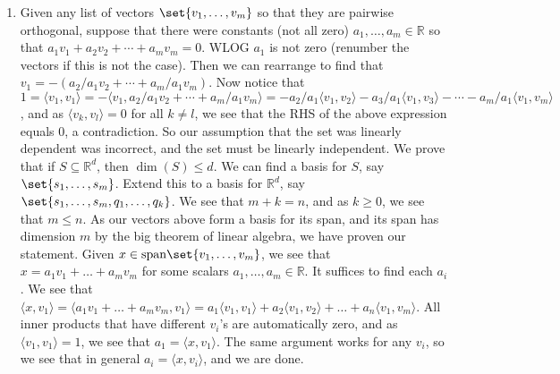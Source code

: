 \documentclass[12pt]{article}
\theoremstyle{definition}
\theoremstyle{remark}
\newcommand{\R}{\mathbb{R}}
\renewcommand{\ip}[2]{\langle #1, #2 \rangle}
\begin{document}
\begin{enumerate}[leftmargin=\labelsep]
		\item Given any list of vectors $\set{v_1, \ldots, v_m}$ so that they are pairwise orthogonal, suppose that there were constants (not all zero) $a_1, \ldots, a_m \in \R$ so that $a_1v_1 + a_2v_2 + \cdots + a_mv_m = 0$. WLOG $a_1$ is not zero (renumber the vectors if this is not the case). Then we can rearrange to find that $v_1 = -(a_2/a_1v_2 + \cdots + a_m/a_1v_m)$. Now notice that $1 = \ip{v_1}{v_1} = -\ip{v_1}{a_2/a_1v_2 + \cdots + a_m/a_1v_m} = -a_2/a_1\ip{v_1}{v_2}-a_3/a_1\ip{v_1}{v_3}-\cdots-a_m/a_1\ip{v_1}{v_m}$, and as $\ip{v_k}{v_l} = 0$ for all $k \neq l$, we see that the RHS of the above expression equals 0, a contradiction. So our assumption that the set was linearly dependent was incorrect, and the set must be linearly independent. We prove that if $S \subseteq \R^d$, then $\dim(S) \leq d$. We can find a basis for $S$, say $\set{s_1, \ldots, s_m}$. Extend this to a basis for $\R^d$, say $\set{s_1, \ldots, s_m, q_1, \ldots, q_k}$. We see that $m + k = n$, and as $k \geq 0$, we see that $m \leq n$. As our vectors above form a basis for its span, and its span has dimension $m$ by the big theorem of linear algebra, we have proven our statement. Given $x \in \mathrm{span}\set{v_1, \ldots, v_m}$, we see that $x = a_1v_1 + \ldots + a_mv_m$ for some scalars $a_1, \ldots, a_m \in \R$. It suffices to find each $a_i$. We see that $\ip{x}{v_1} = \ip{a_1v_1 + \ldots + a_mv_m}{v_1} = a_1\ip{v_1}{v_1} + a_2\ip{v_1}{v_2} + \ldots + a_n\ip{v_1}{v_m}$. All inner products that have different $v_i$'s are automatically zero, and as $\ip{v_1}{v_1} = 1$, we see that $a_1 = \ip{x}{v_1}$. The same argument works for any $v_i$, so we see that in general $a_i = \ip{x}{v_i}$, and we are done.
		

\end{enumerate}
\end{document}
